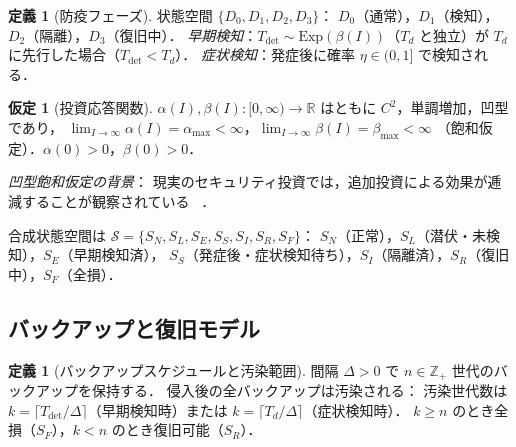 \documentclass[12pt,a4paper]{article}
\theoremstyle{plain}
\theoremstyle{definition}
\newtheorem{definition}[theorem]{定義}
\newtheorem{assumption}[theorem]{仮定}
\theoremstyle{remark}
\newcommand{\Z}{\mathbb{Z}}
\newcommand{\Tdet}{T_{\mathrm{det}}}
\newcommand{\betaI}{\beta(I)}
\newcommand{\alphI}{\alpha(I)}
\begin{document}
\begin{definition}[防疫フェーズ]\label{def:defense}
状態空間 $\{D_0,D_1,D_2,D_3\}$：
$D_0$（通常），$D_1$（検知），$D_2$（隔離），$D_3$（復旧中）．
\emph{早期検知}：$\Tdet\sim\mathrm{Exp}(\betaI)$（$T_d$ と独立）が $T_d$ に先行した場合（$\Tdet<T_d$）．
\emph{症状検知}：発症後に確率 $\eta\in(0,1]$ で検知される．
\end{definition}

\begin{assumption}[投資応答関数]\label{ass:invest}
$\alphI,\betaI:[0,\infty)\to\mathbb{R}$ はともに $C^2$，単調増加，凹型であり，
$\lim_{I\to\infty}\alphI=\alpha_{\max}<\infty$，$\lim_{I\to\infty}\betaI=\beta_{\max}<\infty$
（飽和仮定）．$\alpha(0)>0$，$\beta(0)>0$．

\emph{凹型飽和仮定の背景}：
現実のセキュリティ投資では，追加投資による効果が逓減することが観察されている
~\cite{gordon2002,hausken2006,anderson2020}．
\end{assumption}

合成状態空間は $\mathcal{S}=\{S_N,S_L,S_E,S_S,S_I,S_R,S_F\}$：
$S_N$（正常），$S_L$（潜伏・未検知），$S_E$（早期検知済），
$S_S$（発症後・症状検知待ち），$S_I$（隔離済），$S_R$（復旧中），$S_F$（全損）．

\subsection{バックアップと復旧モデル}

\begin{definition}[バックアップスケジュールと汚染範囲]\label{def:backup}
間隔 $\Delta>0$ で $n\in\Z_+$ 世代のバックアップを保持する．
侵入後の全バックアップは汚染される：
汚染世代数は $k=\lceil\Tdet/\Delta\rceil$（早期検知時）または $k=\lceil T_d/\Delta\rceil$（症状検知時）．
$k\ge n$ のとき全損（$S_F$），$k<n$ のとき復旧可能（$S_R$）．
\end{definition}
\end{document}
